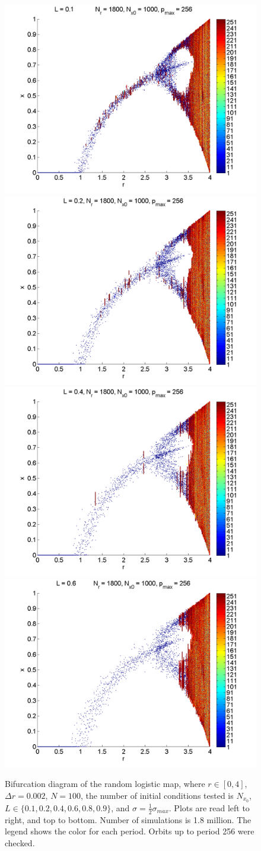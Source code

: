 \begin{figure}[H]\linespread{1}
\caption[Bifurcation diagrams of the random logistic map, $\sigma=\frac{1}{2}\sigma_{max}$]{Bifurcation diagram of the random
logistic map, where $r \in [0,4]$, $\Delta r = 0.002$, $N=100$, the
number of initial conditions tested is $N_{x_0}$, $L\in
\{0.1,0.2,0.4,0.6,0.8,0.9\}$, and $\sigma=\frac{1}{2}\sigma_{max}$. Plots are read left to right, and top to
bottom. Number of simulations is 1.8 million. The legend shows the color for each period. Orbits up to period 256 were checked.}\label{fig:rlogbif_hs}
	\begin{center}
		\includegraphics[width=.5\textwidth]{figs/rlog_bif_halfs_L_01.png}\hfill
		\includegraphics[width=.5\textwidth]{figs/rlog_bif_halfs_L_02.png}\\
		\includegraphics[width=.5\textwidth]{figs/rlog_bif_halfs_L_04.png}\hfill
		\includegraphics[width=.5\textwidth]{figs/rlog_bif_halfs_L_06.png}\\

\end{center}
\end{figure}
